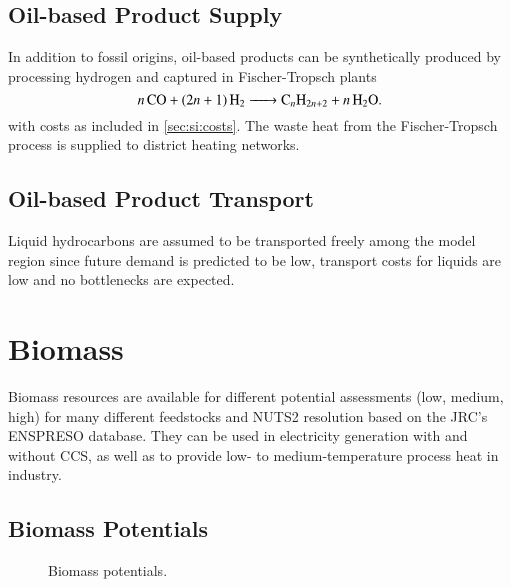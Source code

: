 \subsection{Oil-based Product Supply}
\label{sec:si:oil:supply}

In addition to fossil origins, oil-based products can be synthetically produced
by processing hydrogen and captured \co in Fischer-Tropsch plants
\begin{equation}
    \ce{$n$CO + ($2n$ + 1)H2 -> C_$n$H_{2n+2} + $n$H2O}.
\end{equation}
with costs as included in \cref{sec:si:costs}. The waste heat from the
Fischer-Tropsch process is supplied to district heating networks.

\subsection{Oil-based Product Transport}
\label{sec:si:oil:transport}

Liquid hydrocarbons are assumed to be transported freely among the model region
since future demand is predicted to be low, transport costs for liquids are low
and no bottlenecks are expected.

\section{Biomass}
\label{sec:si:bio}

Biomass resources are available for different potential assessments (low,
medium, high) for many different feedstocks and NUTS2 resolution based on the
JRC’s ENSPRESO database. They can be used in electricity generation with and
without CCS, as well as to provide low- to medium-temperature process heat in
industry.

\subsection{Biomass Potentials}
\label{sec:si:bio:potentials}

\begin{figure}
    \centering
    \caption{Biomass potentials.}
    \label{fig:biomass-potentials}
\end{figure}

